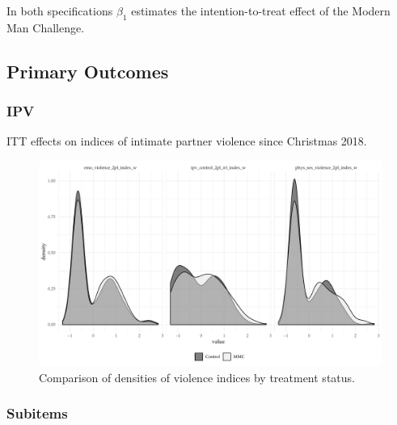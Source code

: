 \documentclass[11pt,english]{article}
\begin{document}
In both specifications $\beta_1$ estimates the intention-to-treat effect of the Modern Man Challenge. 

\subsection{Primary Outcomes}

\subsubsection{IPV}

\begin{table}[H]
\centering

\caption{ITT effects on indices of intimate partner violence since Christmas 2018.}
\label{tab:ipv}
\end{table}

\begin{figure}[H]
\centering
\includegraphics[width = \textwidth]{figures/densities.pdf}
\caption{Comparison of densities of violence indices by treatment status.}
\label{fig:densities}
\end{figure}

\subsubsection{Subitems}
\end{document}

